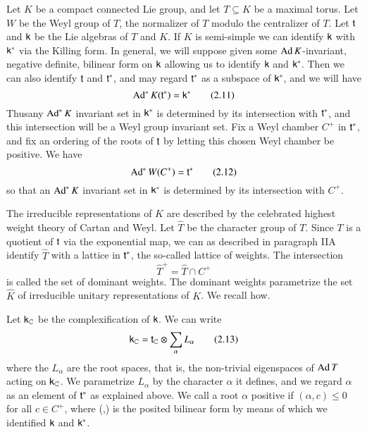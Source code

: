 Let $K$ be a compact connected Lie group, and let $T\subseteq K$ be a maximal torus. Let $W$ be the Weyl group of $T$, the normalizer of $T$ modulo the centralizer of $T$. Let $\mathsf{t}$ and $\mathsf{k}$ be the Lie algebras of $T$ and $K$. If $K$ is semi-simple we can identify $\mathsf{k}$ with $\mathsf{k}^{*}$ via the Killing form. In general, we will suppose given some $\operatorname{Ad} K$-invariant, negative definite, bilinear form on $\mathsf{k}$ allowing us to identify $\mathsf{k}$ and $\mathsf{k}^{*}$. Then we can also identify $\mathsf{t}$ and $\mathsf{t}^{*}$, and may regard $\mathsf{t}^{*}$ as a subspace of $\mathsf{k}^{*}$, and we will have
\begin{equation*}
\operatorname{Ad}^{*}K(\mathsf{t}^{*})=\mathsf{k}^{*}\tag{2.11}\label{art3-eq2.11}
\end{equation*}
Thus\pageoriginale any $\operatorname{Ad}^{*}K$ invariant set in $\mathsf{k}^{*}$ is determined by its intersection with $\mathsf{t}^{*}$, and this intersection will be a Weyl group invariant set. Fix a Weyl chamber $C^{+}$ in $\mathsf{t}^{*}$, and fix an ordering of the roots of $\mathsf{t}$ by letting this chosen Weyl chamber be positive. We have
\begin{equation*}
\operatorname{Ad}^{*}W(C^{+})=\mathsf{t}^{*}\tag{2.12}\label{art3-eq2.12}
\end{equation*}
so that an $\operatorname{Ad}^{*}K$ invariant set in $\mathsf{k}^{*}$ is determined by its intersection with $C^{+}$.

The irreducible representations of $K$ are described by the celebrated highest weight theory of Cartan and Weyl. Let $\widehat{T}$ be the character group of $T$. Since $T$ is a quotient of $\mathsf{t}$ via the exponential map, we can as described in paragraph IIA identify $\widehat{T}$ with a lattice in $\mathsf{t}^{*}$, the so-called lattice of weights. The intersection
$$
\widehat{T}^{+}=\widehat{T}\cap C^{+}
$$
is called the set of dominant weights. The dominant weights parametrize the set $\widehat{K}$ of irreducible unitary representations of $K$. We recall how.

Let $\mathsf{k}_{\mathbb{C}}$ be the complexification of $\mathsf{k}$. We can write
\begin{equation*}
\mathsf{k}_{\mathbb{C}}=\mathsf{t}_{\mathbb{C}}\otimes \sum\limits_{\alpha}L_{\alpha}\tag{2.13}\label{art3-eq2.13}
\end{equation*}
where the $L_{\alpha}$ are the root spaces, that is, the non-trivial eigenspaces of $\operatorname{Ad} T$ acting on $\mathsf{k}_{\mathbb{C}}$. We parametrize $L_{\alpha}$ by the character $\alpha$ it defines, and we regard $\alpha$ as an element of $\mathsf{t}^{*}$ as explained above. We call a root $\alpha$ positive if $(\alpha,c)\leq 0$ for all $c\in C^{+}$, where (,) is the posited bilinear form by means of which we identified $\mathsf{k}$ and $\mathsf{k}^{*}$.

